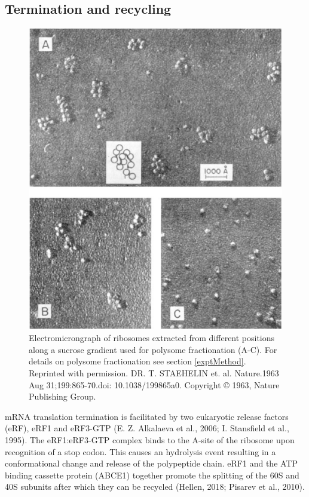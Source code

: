 \documentclass[12pt,openany]{book}
\begin{document}
\clearpage

\subsection{Termination and recycling}\begin{figure}
  \includegraphics{./figures/polysome.pdf}
  \caption{Electromicrongraph of ribosomes extracted from different positions along a sucrose gradient used for polysome fractionation (A-C). For details on polysome fractionation see section \ref{exptMethod}. Reprinted with permission. DR. T. STAEHELIN et. al. Nature.1963 Aug 31;199:865-70.doi: 10.1038/199865a0. Copyright © 1963, Nature Publishing Group.
 \label{fig:polysomes}}
\end{figure}

mRNA translation termination is facilitated by two eukaryotic release
factors (eRF), eRF1 and eRF3-GTP (E. Z. Alkalaeva et al., 2006; I.
Stansfield et al., 1995). The eRF1:eRF3-GTP complex binds to the A-site
of the ribosome upon recognition of a stop codon. This causes an
hydrolysis event resulting in a conformational change and release of the
polypeptide chain. eRF1 and the ATP binding cassette protein (ABCE1)
together promote the splitting of the 60S and 40S subunits after which
they can be recycled (Hellen, 2018; Pisarev et al., 2010).
\end{document}
